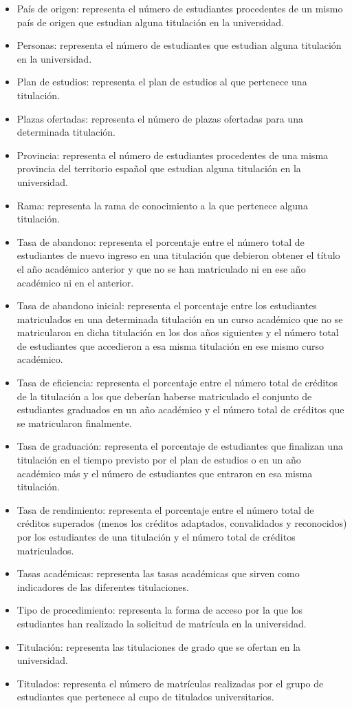 \begin{itemize}
		\item País de origen: representa el número de estudiantes procedentes de un mismo país de origen que estudian alguna titulación en la universidad.
		\item Personas: representa el número de estudiantes que estudian alguna titulación en la universidad.
		\item Plan de estudios: representa el plan de estudios al que pertenece una titulación.
		\item Plazas ofertadas: representa el número de plazas ofertadas para una determinada titulación.
		\item Provincia: representa el número de estudiantes procedentes de una misma provincia del territorio español que estudian alguna titulación en la universidad.
		\item Rama: representa la rama de conocimiento a la que pertenece alguna titulación.
		\item Tasa de abandono: representa el porcentaje entre el número total de estudiantes de nuevo ingreso en una titulación que debieron obtener el título el año académico anterior y que no se han matriculado ni en ese año académico ni en el anterior.
		\item Tasa de abandono inicial: representa el porcentaje entre los estudiantes matriculados en una determinada titulación en un curso académico que no se matricularon en dicha titulación en los dos años siguientes y el número total de estudiantes que accedieron a esa misma titulación en ese mismo curso académico.
		\item Tasa de eficiencia: representa el porcentaje entre el número total de créditos de la titulación a los que deberían haberse matriculado el conjunto de estudiantes graduados en un año académico y el número total de créditos que se matricularon finalmente.
		\item Tasa de graduación: representa el porcentaje de estudiantes que finalizan una titulación en el tiempo previsto por el plan de estudios o en un año académico más y el número de estudiantes que entraron en esa misma titulación.
		\item Tasa de rendimiento: representa el porcentaje entre el número total de créditos superados (menos los créditos adaptados, convalidados y reconocidos) por los estudiantes de una titulación y el número total de créditos matriculados.
		\item Tasas académicas: representa las tasas académicas que sirven como indicadores de las diferentes titulaciones.
		\item Tipo de procedimiento: representa la forma de acceso por la que los estudiantes han realizado la solicitud de matrícula en la universidad.
		\item Titulación: representa las titulaciones de grado que se ofertan en la universidad.
		\item Titulados: representa el número de matrículas realizadas por el grupo de estudiantes que pertenece al cupo de titulados universitarios.
\end{itemize}

